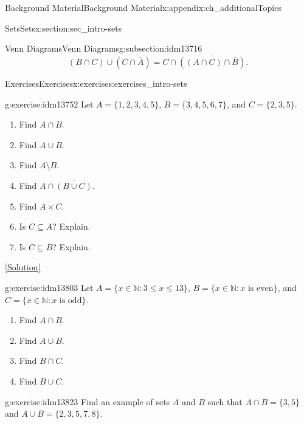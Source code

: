 \documentclass[oneside,10pt,]{book}
\numberwithin{equation}{chapter}
\def\N{\mathbb N}
\def\st{:}
\begin{document}
\begin{appendixptx}{Background Material}{}{Background Material}{}{}{x:appendix:ch_additionalTopics}
\begin{sectionptx}{Sets}{}{Sets}{}{}{x:section:sec_intro-sets}
\begin{subsectionptx}{Venn Diagrams}{}{Venn Diagrams}{}{}{g:subsection:idm13716}
\begin{equation*}
(B \cap C) \cup (C \cap \overline A) = C \cap \overline{\left((A\cap C)\cap \overline B\right)}.
\end{equation*}
%
\end{subsectionptx}
%
%
\typeout{************************************************}
\typeout{************************************************}
%
\begin{exercises-subsection}{Exercises}{}{Exercises}{}{}{x:exercises:exercises_intro-sets}
\begin{divisionexercise}{1}{}{}{g:exercise:idm13752}%
Let \(A = \{1,2,3,4,5\}\), \(B = \{3,4,5,6,7\}\), and \(C = \{2,3,5\}\).%
\par
%
\begin{enumerate}[label=(\alph*)]
\item{}Find \(A \cap B\).%
\item{}Find \(A \cup B\).%
\item{}Find \(A \setminus B\).%
\item{}Find \(A \cap \overline{(B \cup C)}\).%
\item{}Find \(A \times C\).%
\item{}Is \(C \subseteq A\)? Explain.%
\item{}Is \(C \subseteq B\)? Explain.%
\end{enumerate}
%
\space\hspace*{0pt}\hfill{\tiny\hyperlink{g:solution:idm13781-main}{[Solution]}}\end{divisionexercise}%
\begin{divisionexercise}{2}{}{}{g:exercise:idm13803}%
Let \(A = \{x \in \N \st 3 \le x \le 13\}\), \(B = \{x \in \N \st x \mbox{ is even} \}\), and \(C = \{x \in \N \st x \mbox{ is odd} \}\).%
\par
%
\begin{enumerate}[label=(\alph*)]
\item{}Find \(A \cap B\).%
\item{}Find \(A \cup B\).%
\item{}Find \(B \cap C\).%
\item{}Find \(B \cup C\).%
\end{enumerate}
%
\end{divisionexercise}%
\begin{divisionexercise}{3}{}{}{g:exercise:idm13823}%
Find an example of sets \(A\) and \(B\) such that \(A\cap B = \{3, 5\}\) and \(A \cup B = \{2, 3, 5, 7, 8\}\).%
\end{divisionexercise}%

\end{exercises-subsection}
\end{sectionptx}
\end{appendixptx}
\end{document}
